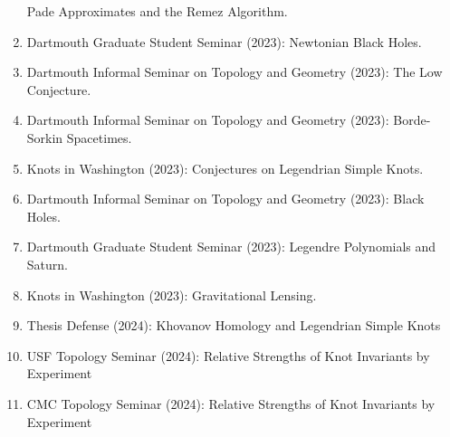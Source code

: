 \documentclass[a4paper,sans]{moderncv}
\begin{document}
\begin{enumerate}
                Pade Approximates and the Remez Algorithm.
            \item
                Dartmouth Graduate Student Seminar (2023):
                Newtonian Black Holes.
            \item
                Dartmouth Informal Seminar on Topology and Geometry (2023):
                The Low Conjecture.
            \item
                Dartmouth Informal Seminar on Topology and Geometry (2023):
                Borde-Sorkin Spacetimes.
            \item
                Knots in Washington (2023):
                Conjectures on Legendrian Simple Knots.
            \item
                Dartmouth Informal Seminar on Topology and Geometry (2023):
                Black Holes.
            \item
                Dartmouth Graduate Student Seminar (2023):
                Legendre Polynomials and Saturn.
            \item
                Knots in Washington (2023):
                Gravitational Lensing.
            \item
                Thesis Defense (2024):
                Khovanov Homology and Legendrian Simple Knots
            \item
                USF Topology Seminar (2024):
                Relative Strengths of Knot Invariants by Experiment
            \item
                CMC Topology Seminar (2024):
                Relative Strengths of Knot Invariants by Experiment
        \end{enumerate}
\end{document}

